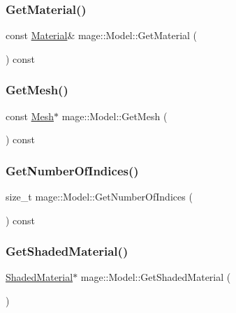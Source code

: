 \subsubsection{\texorpdfstring{Get\+Material()}{GetMaterial()}\hspace{0.1cm}{\footnotesize\ttfamily [2/2]}}
{\footnotesize\ttfamily const \hyperlink{structmage_1_1_material}{Material}\& mage\+::\+Model\+::\+Get\+Material (\begin{DoxyParamCaption}{ }\end{DoxyParamCaption}) const}

\hypertarget{classmage_1_1_model_a085c12b33ebe60e7576c643e2d47baf0}{}\label{classmage_1_1_model_a085c12b33ebe60e7576c643e2d47baf0} 
\subsubsection{\texorpdfstring{Get\+Mesh()}{GetMesh()}}
{\footnotesize\ttfamily const \hyperlink{classmage_1_1_mesh}{Mesh}$\ast$ mage\+::\+Model\+::\+Get\+Mesh (\begin{DoxyParamCaption}{ }\end{DoxyParamCaption}) const}

\hypertarget{classmage_1_1_model_ac118db61c4541d16d9b1b52e55524956}{}\label{classmage_1_1_model_ac118db61c4541d16d9b1b52e55524956} 
\subsubsection{\texorpdfstring{Get\+Number\+Of\+Indices()}{GetNumberOfIndices()}}
{\footnotesize\ttfamily size\+\_\+t mage\+::\+Model\+::\+Get\+Number\+Of\+Indices (\begin{DoxyParamCaption}{ }\end{DoxyParamCaption}) const}

\hypertarget{classmage_1_1_model_af709f5b1ec136cbab25bda39e20e1662}{}\label{classmage_1_1_model_af709f5b1ec136cbab25bda39e20e1662} 
\subsubsection{\texorpdfstring{Get\+Shaded\+Material()}{GetShadedMaterial()}\hspace{0.1cm}{\footnotesize\ttfamily [1/2]}}
{\footnotesize\ttfamily \hyperlink{structmage_1_1_shaded_material}{Shaded\+Material}$\ast$ mage\+::\+Model\+::\+Get\+Shaded\+Material (\begin{DoxyParamCaption}{ }\end{DoxyParamCaption})}

